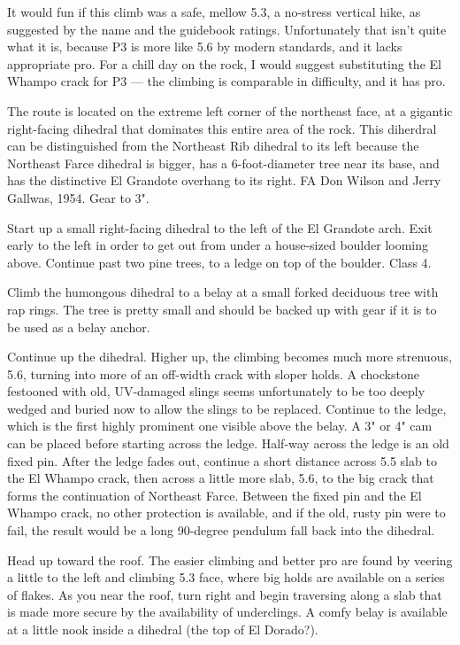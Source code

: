 \documentclass{tahquitz}
\begin{document}



It would fun if this climb was a safe, mellow 5.3, a no-stress
vertical hike, as suggested by the name and the guidebook ratings.
Unfortunately that isn't quite what it is, because P3 is more like 5.6
by modern standards, and it lacks appropriate pro. For a chill day on the
rock, I would suggest substituting the El Whampo crack for P3 --- the climbing
is comparable in difficulty, and it has pro.

The route is located on the extreme left corner of the northeast
face, at a gigantic right-facing dihedral that dominates this entire area of the
rock. This diherdral can be distinguished from the Northeast Rib dihedral to its left
because the Northeast Farce dihedral is bigger, has a 6-foot-diameter tree near its base,
and has the distinctive El Grandote overhang to its right.
FA Don Wilson and Jerry Gallwas, 1954. Gear to 3".

 Start up a small right-facing dihedral to the left of the El Grandote arch.
Exit early to the left in order to get out from under a house-sized boulder
looming above. Continue past two pine trees, to
a ledge on top of the boulder.
Class 4.

 Climb the humongous dihedral to a belay at a small forked deciduous tree with rap
rings. The tree is pretty small and should be backed up with gear if it is to be
used as a belay anchor.

 Continue up the dihedral.
Higher up, the climbing becomes much more strenuous, 5.6, turning
into more of an off-width crack with sloper holds. A chockstone festooned with
old, UV-damaged slings seems unfortunately to be too deeply wedged and buried
now to allow the slings to be replaced. Continue to the ledge, which is the first
highly prominent one visible above the belay. A 3" or 4" cam can be placed before
starting across the ledge. Half-way across the ledge is an old fixed pin. After the
ledge fades out, continue a short distance across 5.5 slab to the El Whampo crack,
then across a little more slab, 5.6, to the big crack that forms the continuation
of Northeast Farce.
Between the fixed pin and the El Whampo crack, no other protection is available,
and if the old, rusty pin were to fail, the result would be a long 90-degree pendulum
fall back into the dihedral.

 Head up toward the roof. The easier climbing and better pro are found
by veering a little to the left and climbing 5.3 face, where big holds are available on a series of flakes.
As you near the roof, turn right and begin traversing
along a slab that is made more secure by the availability of underclings. A comfy
belay is available at a little nook inside a dihedral (the top of El Dorado?).
\end{document}
